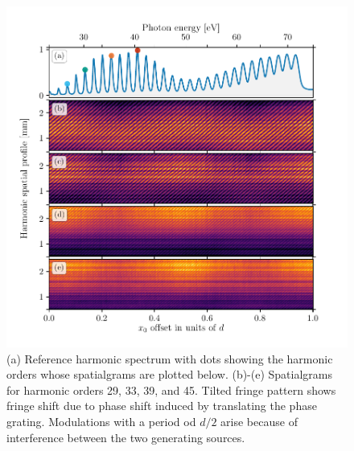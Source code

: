 \begin{figure}
	\centering
	\includegraphics[width=1.0\textwidth]{figures/Two_source/harmonic_spatialgrams.pdf}
	\caption[Reference harmonic spectrum and spatialgrams for various harmonic orders]{(a) Reference harmonic spectrum with dots showing the harmonic orders whose spatialgrams are plotted below. (b)-(e) Spatialgrams for harmonic orders 29, 33, 39, and 45.  Tilted fringe pattern shows fringe shift due to phase shift induced by translating the phase grating. Modulations with a period od $d/2$ arise because of interference between the two generating sources.}
	\label{fig:harmonic_spatialgrams}
\end{figure}


